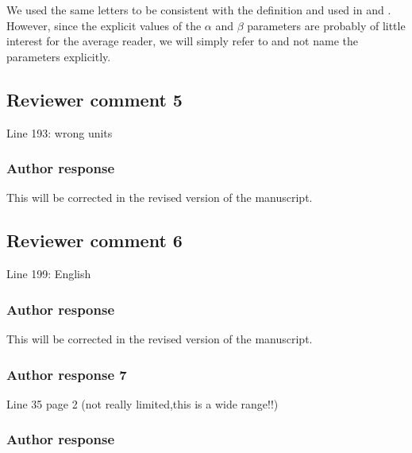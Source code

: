 \documentclass[11pt]{scrartcl}
\begin{document}
We used the same letters to be consistent with the definition and used in
\cite{delanoe14} and \cite{cazenave18}. However, since the explicit values of
the $\alpha$ and $\beta$ parameters are probably of little interest for the
average reader, we will simply refer to \cite{cazenave18} and not name the
parameters explicitly.

\subsection*{Reviewer comment 5}
Line 193: wrong units 

\subsubsection*{Author response}

This will be corrected in the revised version of the manuscript.

\subsection*{Reviewer comment 6}

Line 199: English

\subsubsection*{Author response}


This will be corrected in the revised version of the manuscript.

%


\subsubsection*{Author response 7}
Line 35 page 2 (not really limited,this is a wide range!!)

\subsubsection*{Author response}
\end{document}
